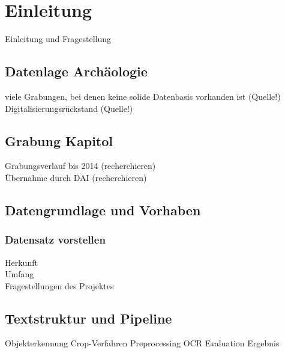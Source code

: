 \section{Einleitung}

Einleitung und Fragestellung\\
\cite{houghpatent}

\subsection{Datenlage Archäologie}
viele Grabungen, bei denen keine solide Datenbasis vorhanden ist (Quelle!)\\
Digitalisierungsrückstand (Quelle!)\\

\subsection{Grabung Kapitol}
Grabungsverlauf bis 2014 (recherchieren)\\
Übernahme durch DAI (recherchieren)\\

\subsection{Datengrundlage und Vorhaben}
\subsubsection{Datensatz vorstellen}
Herkunft\\
Umfang\\
Fragestellungen des Projektes\\

\subsection{Textstruktur und Pipeline}
Objekterkennung
Crop-Verfahren
Preprocessing
OCR
Evaluation
Ergebnis